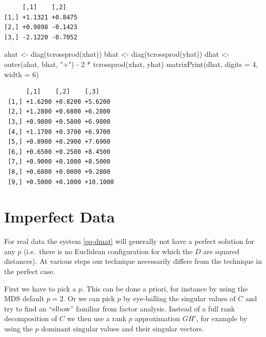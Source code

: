 \documentclass[
  12pt,
  letterpaper,
  DIV=11,
  numbers=noendperiod]{scrartcl}
\newenvironment{Shaded}{\begin{snugshade}}{\end{snugshade}}
\newcommand{\AttributeTok}[1]{\textcolor[rgb]{0.40,0.45,0.13}{#1}}
\newcommand{\DecValTok}[1]{\textcolor[rgb]{0.68,0.00,0.00}{#1}}
\newcommand{\FunctionTok}[1]{\textcolor[rgb]{0.28,0.35,0.67}{#1}}
\newcommand{\NormalTok}[1]{\textcolor[rgb]{0.00,0.23,0.31}{#1}}
\newcommand{\OtherTok}[1]{\textcolor[rgb]{0.00,0.23,0.31}{#1}}
\newcommand{\SpecialCharTok}[1]{\textcolor[rgb]{0.37,0.37,0.37}{#1}}
\newcommand{\StringTok}[1]{\textcolor[rgb]{0.13,0.47,0.30}{#1}}
\newcommand{\sectionbreak}{\clearpage}
\begin{document}
\begin{verbatim}
     [,1]    [,2]   
[1,] +1.1321 +0.8475
[2,] +0.9898 -0.1423
[3,] -2.1220 -0.7052
\end{verbatim}

\begin{Shaded}
\begin{Highlighting}[]
\NormalTok{ahat }\OtherTok{\textless{}{-}} \FunctionTok{diag}\NormalTok{(}\FunctionTok{tcrossprod}\NormalTok{(xhat))}
\NormalTok{bhat }\OtherTok{\textless{}{-}} \FunctionTok{diag}\NormalTok{(}\FunctionTok{tcrossprod}\NormalTok{(yhat))}
\NormalTok{dhat }\OtherTok{\textless{}{-}} \FunctionTok{outer}\NormalTok{(ahat, bhat, }\StringTok{"+"}\NormalTok{) }\SpecialCharTok{{-}} \DecValTok{2} \SpecialCharTok{*} \FunctionTok{tcrossprod}\NormalTok{(xhat, yhat)}
\FunctionTok{matrixPrint}\NormalTok{(dhat, }\AttributeTok{digits =} \DecValTok{4}\NormalTok{, }\AttributeTok{width =} \DecValTok{6}\NormalTok{)}
\end{Highlighting}
\end{Shaded}

\begin{verbatim}
      [,1]    [,2]    [,3]    
 [1,] +1.6200 +0.8200 +5.6200 
 [2,] +1.2800 +0.6800 +6.2800 
 [3,] +0.9800 +0.5800 +6.9800 
 [4,] +1.1700 +0.3700 +6.9700 
 [5,] +0.8900 +0.2900 +7.6900 
 [6,] +0.6500 +0.2500 +8.4500 
 [7,] +0.9000 +0.1000 +8.5000 
 [8,] +0.6800 +0.0800 +9.2800 
 [9,] +0.5000 +0.1000 +10.1000
\end{verbatim}

\sectionbreak

\section{Imperfect Data}\label{imperfect-data}

For real data the system \eqref{eq-dmat} will generally not have a
perfect solution for any \(p\) (i.e.~there is no Euclidean configuration
for which the \(D\) are squared distances). At various steps our
technique necessarily differs from the technique in the perfect case.

First we have to pick a \(p\). This can be done a priori, for instance
by using the MDS default \(p = 2\). Or we can pick \(p\) by eye-balling
the singular values of \(C\) and try to find an ``elbow'' familiar from
factor analysis. Instead of a full rank decomposition of \(C\) we then
use a rank \(p\) approximation \(GH'\), for example by using the \(p\)
dominant singular values and their singular vectors.
\end{document}
